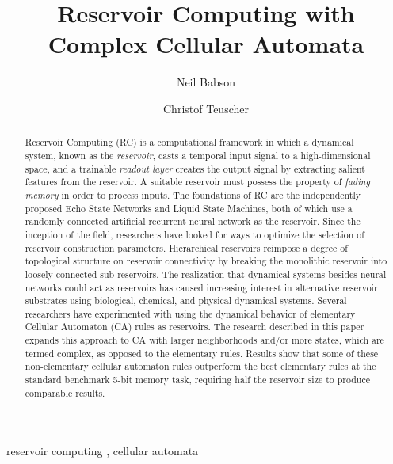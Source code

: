\documentclass{elsarticle}
\begin{document}
\begin{frontmatter}

\title{Reservoir Computing with Complex Cellular Automata}
\author{Neil Babson} %

\author{Christof Teuscher}
\address{Portland State University, P.O.  Box 751, Portland, OR 97207-0751, 
   USA}
   



\begin{abstract}
Reservoir Computing (RC) is a computational framework in which a dynamical system, 
          known as the \textit{reservoir}, casts a temporal input signal to a 
          high-dimensional space, and a trainable \textit{readout layer} 
          creates the output signal by extracting salient features from the 
          reservoir.
A suitable reservoir  must possess the property of 
\textit{fading memory} in order to process inputs. The foundations of RC are the 
independently proposed Echo State Networks and Liquid State Machines, both of 
which use a randomly connected artificial recurrent neural network as the 
reservoir. Since the inception of the field, researchers have looked for ways 
to optimize the selection of reservoir construction parameters. Hierarchical 
reservoirs reimpose a degree of topological structure on reservoir connectivity 
by breaking the monolithic reservoir into loosely connected sub-reservoirs. The 
realization that dynamical systems besides neural networks could act as 
reservoirs has caused increasing interest in alternative reservoir substrates 
using biological, chemical, and physical dynamical systems. Several researchers 
have experimented with using the dynamical behavior of elementary Cellular 
Automaton (CA) rules as reservoirs. The research described in this paper expands 
this approach to CA with larger neighborhoods and/or more 
states, which are termed complex, as opposed to the elementary rules. Results 
show that some of these non-elementary cellular automaton rules outperform the 
best elementary rules at the standard benchmark 5-bit memory task, requiring 
half the reservoir size to produce comparable results.
\end{abstract}

\begin{keyword}
reservoir computing \sep
cellular automata

\end{keyword}

\end{frontmatter}
\end{document}
